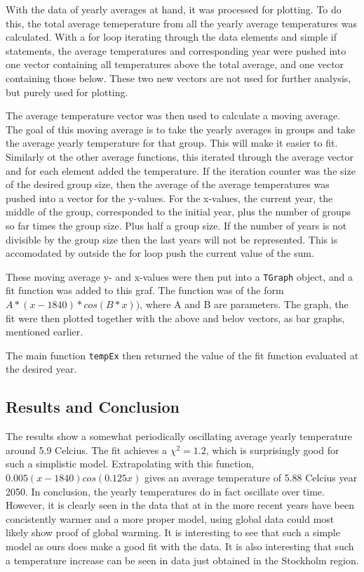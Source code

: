 With the data of yearly averages at hand, it was processed for plotting. To do this, the total average temeperature from all the yearly average temperatures was calculated. With a for loop iterating through the data elements and simple if statements, the average temperatures and corresponding year were pushed into one vector containing all temperatures above the total average, and one vector containing those below. These two new vectors are not used for further analysis, but purely used for plotting.

The average temperature vector was then used to calculate a moving average. The goal of this moving average is to take the yearly averages in groups and take the average yearly temperature for that group. This will make it easier to fit. Similarly ot the other average functions, this iterated through the average vector and for each element added the temperature. If the iteration counter was the size of the desired group size, then the average of the average temperatures was pushed into a vector for the y-values. For the x-values, the current year, the middle of the group, corresponded to the initial year, plus the number of groups so far times the group size. Plus half a group size. If the number of years is not divisible by the group size then the last years will not be represented. This is accomodated by outside the for loop push the current value of the sum.

These moving average y- and x-values were then put into a \texttt{TGraph} object, and a fit function was added to this graf. The function was of the form $A*(x-1840)*cos(B*x))$, where A and B are parameters. The graph, the fit were then plotted together with the above and belov vectors, as bar graphs, mentioned earlier.

The main function \texttt{tempEx} then returned the value of the fit function evaluated at the desired year.

\subsection{Results and Conclusion}

The results show a somewhat periodically oscillating average yearly temperature around 5.9 Celcius. The fit achieves a $\chi ^2=1.2$, which is surprisingly good for such a simplistic model. Extrapolating with this function, $0.005(x-1840)cos(0.125x)$ gives an average temperature of 5.88 Celcius year 2050. In conclusion, the yearly temperatures do in fact oscillate over time. However, it is clearly seen in the data that at in the more recent years have been concistently warmer and a more proper model, using global data could most likely show proof of global warming. It is interesting to see that such a simple model as ours does make a good fit with the data. It is also interesting that such a temperature increase can be seen in data just obtained in the Stockholm region. 





